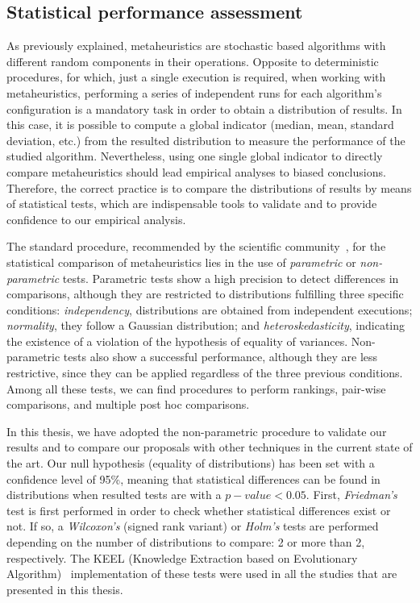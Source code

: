 \subsection{Statistical performance assessment}
\label{ch.Meta.ssec:analisis}

As previously explained, metaheuristics are stochastic based algorithms with different random components in their operations. Opposite to deterministic procedures, for which, just a single execution is required, when working with metaheuristics, performing a series of independent runs for each algorithm’s configuration is a mandatory task in order to obtain a distribution of results. In this case, it is possible to compute a global indicator (median, mean, standard deviation, etc.) from the resulted distribution to measure the performance of the studied algorithm. Nevertheless, using one single global indicator to directly compare metaheuristics should lead empirical analyses to biased conclusions. Therefore, the correct practice is to compare the distributions of results by means of statistical tests, which are indispensable tools to validate and to provide confidence to our empirical analysis.

The standard procedure, recommended by the scientific community~\cite{libraco-statistics, Garcia2008}, for the statistical comparison of metaheuristics lies in the use of \emph{parametric} or \emph{non-parametric} tests. Parametric tests show a high precision to detect differences in comparisons, although they are restricted to distributions fulfilling three specific conditions: \emph{independency}, distributions are obtained from independent executions; \emph{normality}, they follow a Gaussian distribution; and \emph{heteroskedasticity}, indicating the existence of a violation of the hypothesis of equality of variances. Non-parametric tests also show a successful performance, although they are less restrictive, since they can be applied regardless of the three previous conditions. Among all these tests, we can find procedures to perform rankings, pair-wise comparisons, and multiple post hoc comparisons.

In this thesis, we have adopted the non-parametric procedure to validate our results and to compare our proposals with other techniques in the current state of the art. Our null hypothesis (equality of distributions) has been set with a confidence level of 95\%, meaning that statistical differences can be found in distributions when resulted tests are with a $p-value < 0.05$. First, \emph{Friedman’s} test is first performed in order to check whether statistical differences exist or not. If so, a \emph{Wilcoxon’s} (signed rank variant) or \emph{Holm’s} tests are performed depending on the number of distributions to compare: 2 or more than 2, respectively. The KEEL (Knowledge Extraction based on Evolutionary Algorithm)~\cite{alcala2011keel} implementation of these tests were used in all the studies that are presented in this thesis.
